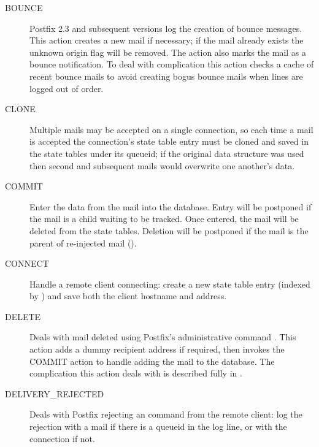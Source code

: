 \begin{description}

    \item [BOUNCE] Postfix 2.3 and subsequent versions log the creation of
        bounce messages.  This action creates a new mail if necessary; if
        the mail already exists the unknown origin flag will be removed.
        The action also marks the mail as a bounce notification.  To deal
        with complication  this action checks a cache of
        recent bounce mails to avoid creating bogus bounce mails when lines
        are logged out of order.

    \item [CLONE] Multiple mails may be accepted on a single connection, so
        each time a mail is accepted the connection's state table entry
        must be cloned and saved in the state tables under its queueid; if
        the original data structure was used then second and subsequent
        mails would overwrite one another's data.

    \item [COMMIT] Enter the data from the mail into the database. Entry
        will be postponed if the mail is a child waiting to be tracked.
        Once entered, the mail will be deleted from the state tables.
        Deletion will be postponed if the mail is the parent of re-injected
        mail ().

    \item [CONNECT] Handle a remote client connecting: create a new state
        table entry (indexed by  \pid{}) and save both the
        client hostname and \IP{} address.

    \item [DELETE] Deals with mail deleted using Postfix's administrative
        command .  This action adds a dummy recipient
        address if required, then invokes the COMMIT action to handle
        adding the mail to the database.  The complication this action
        deals with is described fully in .  

    \item [DELIVERY\_REJECTED] Deals with Postfix rejecting an \SMTP{}
        command from the remote client: log the rejection with a mail if
        there is a queueid in the log line, or with the connection if not.


\end{description}
